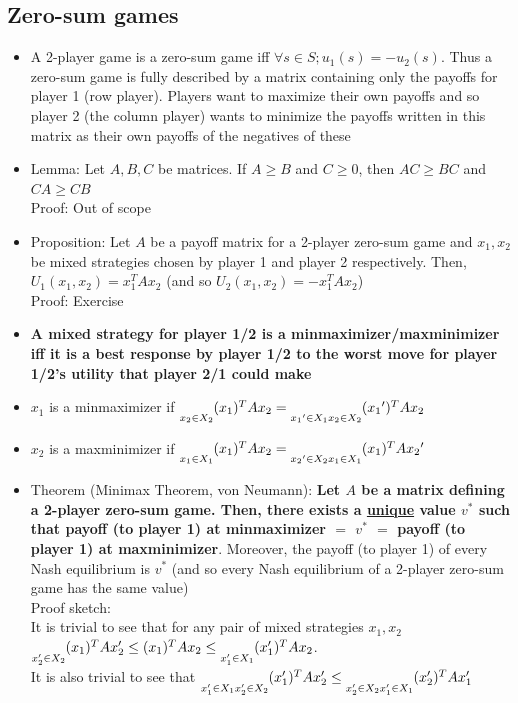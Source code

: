 \documentclass[20pt,a4paper,landscape]{extarticle}
\let\max\relax
\DeclareMathOperator*{\max}{max\:}
\let\min\relax
\DeclareMathOperator*{\min}{min\:}
\begin{document}
\begin{flushleft}
\subsection{Zero-sum games}
\begin{itemize}
\item A 2-player game is a zero-sum game iff $\forall s \in S; u_1(s) = -u_2(s)$. Thus a zero-sum game is fully described by a matrix containing only the payoffs for player 1 (row player). Players want to maximize their own payoffs and so player 2 (the column player) wants to minimize the payoffs written in this matrix as their own payoffs of the negatives of these
\item Lemma: Let $A, B, C$ be matrices. If $A \geq B$ and $C \geq 0$, then $AC \geq BC$ and $CA \geq CB$\\
Proof: Out of scope
\item Proposition: Let $A$ be a payoff matrix for a 2-player zero-sum game and $x_1, x_2$ be mixed strategies chosen by player 1 and player 2 respectively. Then, $U_1(x_1, x_2) = x_1^TAx_2$ (and so $U_2(x_1, x_2) = -x_1^TAx_2$)\\
Proof: Exercise
\item \textbf{A mixed strategy for player 1/2 is a minmaximizer/maxminimizer iff it is a best response by player 1/2 to the worst move for player 1/2's utility that player 2/1 could make}
\item $x_1$ is a minmaximizer if $\underset{x_2 \in X_2}{\min} (x_1)^TAx_2 = \underset{{x_1}' \in X_1}{\max} \underset{x_2 \in X_2}{\min} ({x_1}')^TAx_2$
\item $x_2$ is a maxminimizer if $\underset{x_1 \in X_1}{\max} (x_1)^TAx_2 = \underset{{x_2}' \in X_2}{\min} \underset{x_1 \in X_1}{\max} (x_1)^TA{x_2}'$
\item Theorem (Minimax Theorem, von Neumann): \textbf{Let \boldmath$A$ be a matrix defining a 2-player zero-sum game. Then, there exists a \underline{unique} value $v^\ast$ such that payoff (to player 1) at minmaximizer $=$ $v^\ast$ $=$ payoff (to player 1) at maxminimizer}. Moreover, the payoff (to player 1) of every Nash equilibrium is $v^\ast$ (and so every Nash equilibrium of a 2-player zero-sum game has the same value)\\
Proof sketch:\\
It is trivial to see that for any pair of mixed strategies $x_1, x_2$ $\underset{x_2' \in X_2}{\min} (x_1)^TAx_2' \leq (x_1)^TAx_2 \leq \underset{x_1' \in X_1}{\max} (x_1')^TAx_2$.\\
It is also trivial to see that $\underset{x_1' \in X_1}{\max} \underset{x_2' \in X_2}{\min} (x_1')^TAx_2' \leq \underset{x_2' \in X_2}{\min} \underset{x_1' \in X_1}{\max} (x_2')^TAx_1'$\\

\end{itemize}
\end{flushleft}
\end{document}
